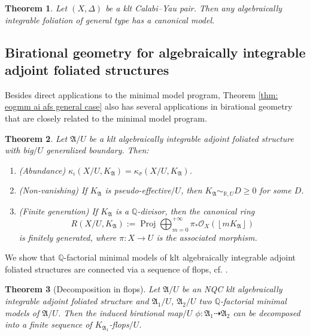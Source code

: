 \documentclass[12pt]{amsart}
\numberwithin{equation}{section}
\newcommand{\Qq}{\mathbb{Q}}
\newcommand{\Proj}{{\operatorname{Proj}}}
\newcommand{\Aa}{{\mathfrak{A}}}
\newtheorem{thmsub}{Theorem}[subsection]
\theoremstyle{definition}
\theoremstyle{definition}
\theoremstyle{definition}
\begin{document}
\begin{thmsub}\label{thm: gmm klt algint foliation gt on cy variety}
Let $(X,\Delta)$ be a klt Calabi--Yau pair. Then any algebraically integrable foliation of general type has a canonical model.
\end{thmsub}

\subsection{Birational geometry for algebraically integrable adjoint foliated structures}

Besides direct applications to the minimal model program,  Theorem \ref{thm: eogmm ai afs general case} also has several applications in birational geometry that are closely related to the minimal model program.

\begin{thmsub}\label{thm: abundance ai afs}
  Let $\Aa/U$ be a klt algebraically integrable adjoint foliated structure with big$/U$ generalized boundary. Then:
  \begin{enumerate}
      \item (Abundance) $\kappa_{\iota}(X/U,K_{\Aa})=\kappa_{\sigma}(X/U,K_{\Aa})$.
      \item (Non-vanishing) If $K_{\Aa}$ is pseudo-effective$/U$, then $K_{\Aa}\sim_{\mathbb R,U}D\geq 0$ for some $D$.
      \item (Finite generation) If $K_{\Aa}$ is a $\mathbb Q$-divisor, then the canonical ring
$$R(X/U,K_{\Aa}):=\Proj\bigoplus_{m=0}^{+\infty}\pi_*\mathcal{O}_X\left(\left\lfloor mK_{\Aa}\right\rfloor\right)$$
is finitely generated, where $\pi: X\rightarrow U$ is the associated morphism.
  \end{enumerate}
\end{thmsub}


We show that $\mathbb Q$-factorial minimal models of klt algebraically integrable adjoint foliated structures are connected via a sequence of flops, cf. \cite{JV23,CLW24, CM24}.

\begin{thmsub}[Decomposition in flops]\label{thm: flop ai afs}
  Let $\Aa/U$ be an NQC klt algebraically integrable adjoint foliated structure and $\Aa_1/U$, $\Aa_2/U$ two $\Qq$-factorial minimal models of $\Aa/U$. Then the induced birational map$/U$ $\phi: \Aa_1\dashrightarrow \Aa_2$ can be decomposed into a finite sequence of $K_{\Aa_1}$-flops$/U$.
\end{thmsub}
\end{document}

